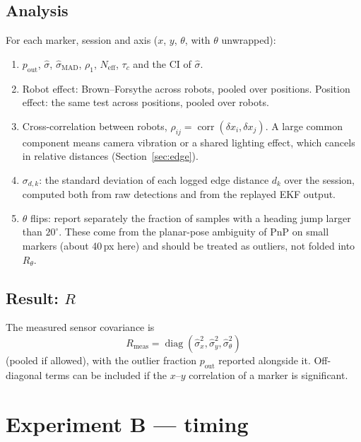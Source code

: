 \documentclass[11pt,a4paper]{article}
\begin{document}
\subsection{Analysis}
For each marker, session and axis ($x$, $y$, $\theta$, with $\theta$ unwrapped):
\begin{enumerate}[leftmargin=*]
\item $p_\text{out}$, $\hat\sigma$, $\hat\sigma_\text{MAD}$, $\rho_1$, $N_\text{eff}$, $\tau_c$ and the CI of $\hat\sigma$.
\item Robot effect: Brown--Forsythe across robots, pooled over positions.
      Position effect: the same test across positions, pooled over robots.
\item Cross-correlation between robots,
      $\rho_{ij}=\operatorname{corr}(\delta x_i,\delta x_j)$. A large common
      component means camera vibration or a shared lighting effect, which
      cancels in relative distances (Section~\ref{sec:edge}).
\item $\sigma_{d,k}$: the standard deviation of each logged edge distance
      $d_k$ over the session, computed both from raw detections and from
      the replayed EKF output.
\item $\theta$ flips: report separately the fraction of samples with a
      heading jump larger than $20^\circ$. These come from the
      planar-pose ambiguity of PnP on small markers (about 40\,px here) and
      should be treated as outliers, not folded into $R_\theta$.
\end{enumerate}

\subsection{Result: \texorpdfstring{$R$}{R}}
The measured sensor covariance is
\begin{equation}
  R_\text{meas}=\operatorname{diag}(\hat\sigma_x^2,\hat\sigma_y^2,\hat\sigma_\theta^2)
\end{equation}
(pooled if allowed), with the outlier fraction $p_\text{out}$ reported
alongside it. Off-diagonal terms can be included if the $x$--$y$ correlation
of a marker is significant.

\section{Experiment B --- timing}
\label{sec:timing}
\end{document}
